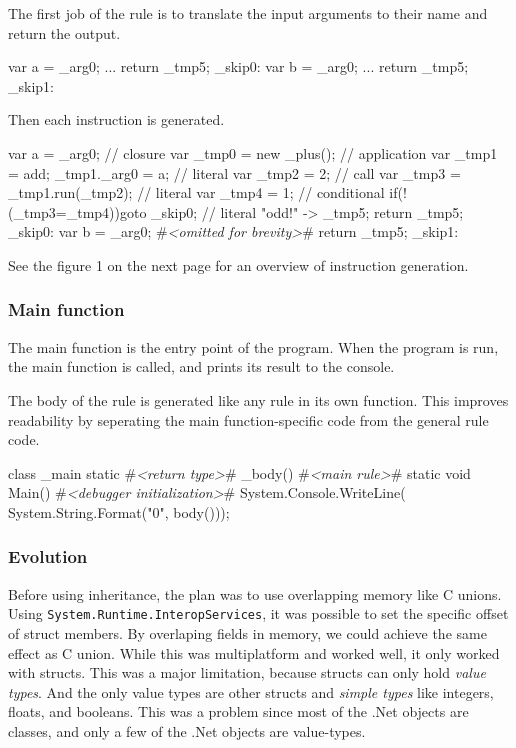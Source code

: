 The first job of the rule is to translate the input arguments to their name and return the output.

\begin{CS}
    {
        var a = _arg0; 
        ...
        return _tmp5;
    }
    _skip0:
    {
        var b = _arg0;
        ...
        return _tmp5;
    }
    _skip1:
\end{CS}

Then each instruction is generated.

\begin{CS}[escapeinside=\#\#]
    {
        var a = _arg0; 
        // closure
        var _tmp0 = new _plus(); 
        // application
        var _tmp1 = add;
        _tmp1._arg0 = a;
        // literal
        var _tmp2 = 2;
        // call
        var _tmp3 = _tmp1.run(_tmp2);
        // literal     
        var _tmp4 = 1;
        // conditional
        if(!(_tmp3=_tmp4)){goto _skip0;}
        // literal
        "odd!" -> _tmp5;
        return _tmp5;
    }
    _skip0:
    {
        var b = _arg0;
        #\textit{<omitted for brevity>}#
        return _tmp5;
    }
    _skip1:
\end{CS}

See the figure 1 on the next page for an overview of instruction generation.


\subsubsection{Main function}
The main function is the entry point of the program.
When the program is run, the main function is called, and prints its result to the console.

The body of the rule is generated like any rule in its own function.
This improves readability by seperating the main function-specific code from the general rule code.

\begin{CS}[escapeinside=\#\#]
class _main{
    static #\textit{<return type>}# _body(){
        #\textit{<main rule>}#
    }
    static void Main(){
        #\textit{<debugger initialization>}#
        System.Console.WriteLine(
            System.String.Format("{0}", 
                                 body()));
    }
}
\end{CS}


\subsubsection{Evolution}
Before using inheritance, the plan was to use overlapping memory like C unions. 
Using \verb|System.|\verb|Runtime.|\verb|InteropServices|, it was possible to set the specific offset of struct members.
By overlaping fields in memory, we could achieve the same effect as C union.
While this was multiplatform and worked well, it only worked with structs.
This was a major limitation, because structs can only hold \textit{value types}.
And the only value types are other structs and \textit{simple types} like integers, floats, and booleans.
This was a problem since most of the .Net objects are classes, and only a few of the .Net objects are value-types.

